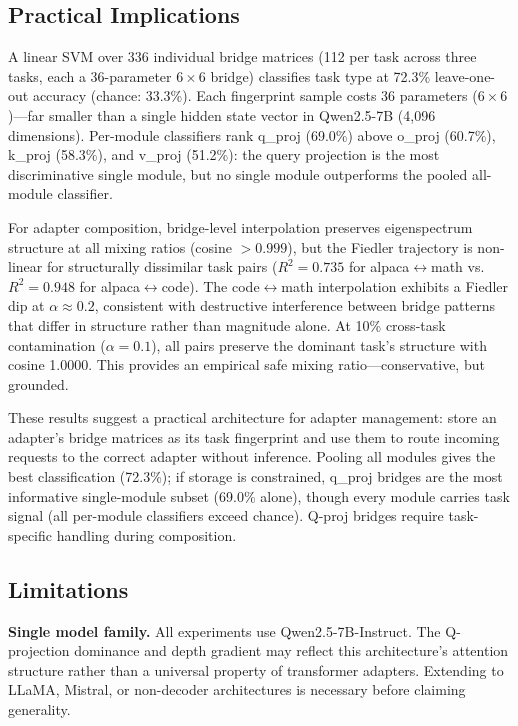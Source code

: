 \subsection{Practical Implications}

A linear SVM over 336 individual bridge matrices (112 per task
across three tasks, each a 36-parameter $6 \times 6$ bridge)
classifies task type at 72.3\% leave-one-out accuracy (chance:
33.3\%). Each fingerprint sample costs 36 parameters ($6 \times
6$)---far smaller than a single hidden state vector in Qwen2.5-7B
(4{,}096 dimensions). Per-module classifiers rank q\_proj (69.0\%)
above o\_proj (60.7\%), k\_proj (58.3\%), and v\_proj (51.2\%): the
query projection is the most discriminative single module, but no
single module outperforms the pooled all-module classifier.

For adapter composition, bridge-level interpolation preserves
eigenspectrum structure at all mixing ratios (cosine $> 0.999$),
but the Fiedler trajectory is non-linear for structurally
dissimilar task pairs ($R^2 = 0.735$ for alpaca$\leftrightarrow$math
vs.\ $R^2 = 0.948$ for alpaca$\leftrightarrow$code). The
code$\leftrightarrow$math interpolation exhibits a Fiedler dip at
$\alpha \approx 0.2$, consistent with destructive interference
between bridge patterns that differ in structure rather than
magnitude alone. At 10\% cross-task contamination ($\alpha = 0.1$),
all pairs preserve the dominant task's structure with cosine 1.0000.
This provides an empirical safe mixing ratio---conservative, but
grounded.

These results suggest a practical architecture for adapter management:
store an adapter's bridge matrices as its task fingerprint and use
them to route incoming requests to the correct adapter without
inference. Pooling all modules gives the best classification
(72.3\%); if storage is constrained, q\_proj bridges are the most
informative single-module subset (69.0\% alone), though every module
carries task signal (all per-module classifiers exceed chance).
Q-proj bridges require task-specific handling during composition.

\subsection{Limitations}
\label{sec:limitations}

\textbf{Single model family.} All experiments use Qwen2.5-7B-Instruct.
The Q-projection dominance and depth gradient may reflect this
architecture's attention structure rather than a universal property
of transformer adapters. Extending to LLaMA, Mistral, or non-decoder
architectures is necessary before claiming generality.

